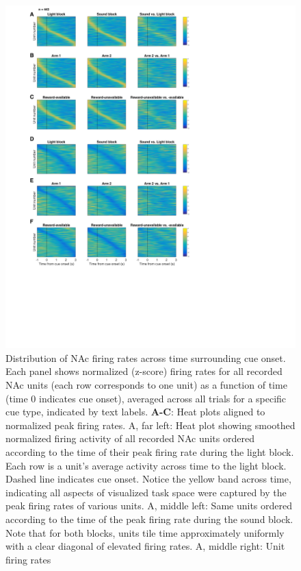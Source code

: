 \documentclass[11pt]{article}
\newcommand{\bsf}[1]{\textbf{#1}}
\begin{document}
{\begin{figure}[h]
\centering
\includegraphics[height=0.5\textheight]{Fig 8 - Task tiling.png}
\caption{Distribution of NAc firing rates across time surrounding cue
  onset. Each panel shows normalized (z-score) firing rates for all recorded NAc
  units (each row corresponds to one unit) as a function of time (time 0
  indicates cue onset), averaged across all trials for a specific cue type,
  indicated by text labels. \bsf{A-C}: Heat plots aligned to normalized peak
  firing rates. A, far left: Heat plot showing smoothed normalized firing
  activity of all recorded NAc units ordered according to the time of their peak
  firing rate during the light block. Each row is a unit’s average activity
  across time to the light block. Dashed line indicates cue onset. Notice the
  yellow band across time, indicating all aspects of visualized task space were
  captured by the peak firing rates of various units. A, middle left: Same units
  ordered according to the time of the peak firing rate during the sound
  block. Note that for both blocks, units tile time approximately uniformly with
  a clear diagonal of elevated firing rates. A, middle right: Unit firing rates
}
\end{figure}}
\end{document}
